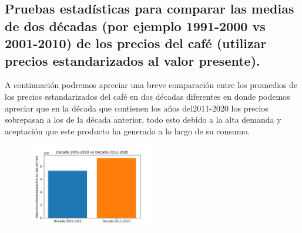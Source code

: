 \documentclass[11pt,letterpaper,twocolumn]{article}
\begin{document}
\subsection{Pruebas estadísticas para comparar las medias de dos
décadas (por ejemplo 1991-2000 vs 2001-2010) de los precios del café
(utilizar precios estandarizados al valor presente).}

A continuación podremos apreciar una breve comparación entre los
promedios de los precios estandarizados del café en dos décadas
diferentes en donde podemos apreciar que en la década que contienen
los años del2011-2020 los precios sobrepasan a los de la década 
anterior, todo esto debido a la alta demanda y aceptación  que este
producto ha generado a lo largo de su consumo.
\begin{figure}[H]
            \centering
            \includegraphics[width=0.5\textwidth]{imagenes/punto4.png}
            \caption{\label{fig4:frog}}
        \end{figure}
        
        
\end{document}

